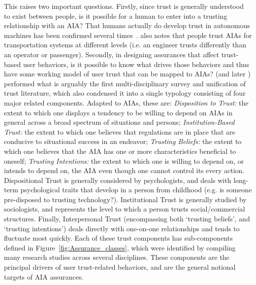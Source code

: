 This raises two important questions. Firstly, since trust is generally understood to exist between people, is it possible for a human to enter into a trusting relationship with an AIA? 
That humans actually do develop trust in autonomous machines has been confirmed several times~\cite{Muir1996-gt,Mcknight2011-gv,Riley1996-qm,Bainbridge2011-pl,Salem2015-md,Desai2012-rc, Freedy2007-sg, Kaniarasu2013-ho, Wang2016-id}. 
\citet{Lacher2014-yc} also notes that people trust AIAs for transportation systems at different levels (i.e. an engineer trusts differently than an operator or passenger). 
Secondly, in designing assurances that affect trust-based user behaviors, is it possible to know what drives those behaviors and thus have some working model of user trust that can be mapped to AIAs? 
\citet{McKnight1998-ty} (and later \cite{McKnight2001-fa}) performed what is arguably the first multi-disciplinary survey and unification of trust literature, which also condensed it into a single typology consisting of four major related components. 
Adapted to AIAs, these are: \textit{Disposition to Trust:} the extent to which one displays a tendency to be willing to depend on AIAs in general across a broad spectrum of situations and persons; \textit{Institution-Based Trust:} the extent to which one believes that regulations are in place that are conducive to situational success in an endeavor; \textit{Trusting Beliefs:} the extent to which one believes that the AIA has one or more characteristics beneficial to oneself; \textit{Trusting Intentions:} the extent to which one is willing to depend on, or intends to depend on, the AIA even though one cannot control its every action. 
Dispositional Trust is generally considered by psychologists, and deals with long-term psychological traits that develop in a person from childhood (e.g. is someone pre-disposed to trusting technology?).  
Institutional Trust 
is generally studied by sociologists, and represents the level to which a person trusts social/commercial structures. 
Finally, Interpersonal Trust (encompassing both `trusting beliefs', and `trusting intentions') deals directly with one-on-one relationships and tends to fluctuate most quickly. 
Each of these trust components has sub-components defined in Figure~\ref{fig:Assurance_classes}, which were identified by compiling many research studies across several disciplines. 
These components are the principal drivers of user trust-related behaviors, and are the general notional targets of AIA assurances.

